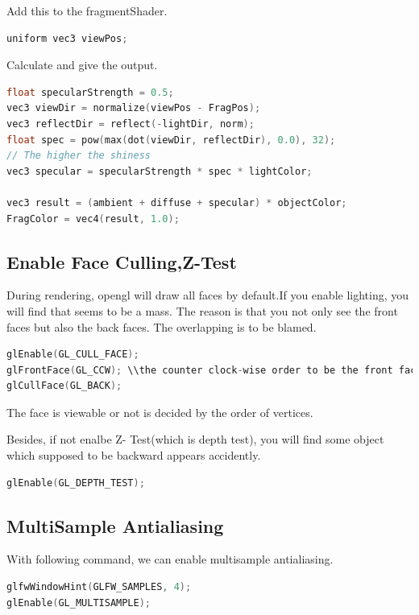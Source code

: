 \documentclass[acmtog]{acmart}
\begin{document}
\par Add this to the fragmentShader.
\begin{lstlisting}[frame=single,breaklines=true,language=c++,basicstyle=\footnotesize\ttfamily]
uniform vec3 viewPos;
\end{lstlisting}
\par Calculate and give the output.
\begin{lstlisting}[frame=single,breaklines=true,language=c++,basicstyle=\footnotesize\ttfamily]
float specularStrength = 0.5;
vec3 viewDir = normalize(viewPos - FragPos);
vec3 reflectDir = reflect(-lightDir, norm);
float spec = pow(max(dot(viewDir, reflectDir), 0.0), 32);
// The higher the shiness
vec3 specular = specularStrength * spec * lightColor;

vec3 result = (ambient + diffuse + specular) * objectColor;
FragColor = vec4(result, 1.0);
\end{lstlisting}
\subsection{Enable Face Culling,Z-Test }
During rendering, opengl will draw all faces by default.If you enable lighting, you will find that seems to be a mass. The reason is that you not only see the front faces but also the back faces. The overlapping is to be blamed.
\begin{lstlisting}[frame=single,breaklines=true,language=c++,basicstyle=\footnotesize\ttfamily]
glEnable(GL_CULL_FACE);
glFrontFace(GL_CCW); \\the counter clock-wise order to be the front face
glCullFace(GL_BACK);
\end{lstlisting}
\par The face is viewable or not is decided by the order of vertices.
\par Besides, if not enalbe Z- Test(which is depth test), you will find some object which supposed to be backward appears accidently.
\begin{lstlisting}[frame=single,breaklines=true,language=c++,basicstyle=\footnotesize\ttfamily]
glEnable(GL_DEPTH_TEST);
\end{lstlisting}
\subsection{MultiSample Antialiasing}
With following command, we can enable multisample antialiasing.
\begin{lstlisting}[frame=single,breaklines=true,language=c++,basicstyle=\footnotesize\ttfamily]
glfwWindowHint(GLFW_SAMPLES, 4);
glEnable(GL_MULTISAMPLE);
\end{lstlisting}
\end{document}
